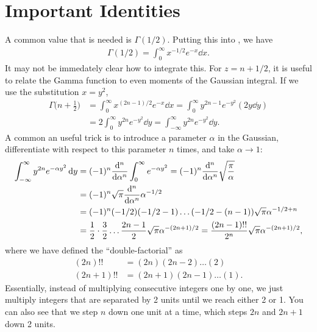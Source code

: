 \section{Important Identities}

A common value that is needed is $\Gamma(1/2)$.
Putting this into , we have
\begin{eqnarray}
    \Gamma(1/2) = \int_{0}^{\infty} x^{-1/2} e^{-x} \dd{x}
.\end{eqnarray}
It may not be immedately clear how to integrate this.
For $z = n + 1/2$, it is useful to relate the Gamma function to even moments of the Gaussian integral.
If we use the substitution $x = y^2$,
\begin{align}
    \Gamma\Big(n + \frac{1}{2} \Big) &= \int_{0}^{\infty} x^{(2n-1)/2} e^{-x} \dd{x} = \int_{0}^{\infty} y^{2n - 1} e^{-y^2} ( 2 y \dd{y} ) \nonumber \\
    \label{eq:gamma-odd-half-int}
                                     &= 2 \int_{0}^{\infty} y^{2n} e^{-y^2} \dd{y} = \int_{-\infty}^{\infty} y^{2n} e^{-y^2} \dd{y}
.\end{align}
A common an useful trick is to introduce a parameter $\alpha$ in the Gaussian, differentiate with respect to this parameter $n$ times, and take $\alpha \rightarrow 1$:
\begin{align}
    \int_{-\infty}^{\infty} y^{2n} e^{-\alpha y^2} \dd{y} &= (-1)^{n} \dv[n]{\alpha} \int_{0}^{\infty} e^{-\alpha y^2} = (-1)^{n} \dv[n]{\alpha} \sqrt{\frac{\pi}{\alpha}} \nonumber \\
                                                          &= (-1)^{n} \sqrt{\pi} \dv[n]{\alpha} \alpha^{-1/2} \nonumber \\
                                                          &= (-1)^{n}(-1/2)(-1/2 - 1)\hdots(-1/2 - (n-1)) \sqrt{\pi} \alpha^{-1/2 + n} \nonumber \\
                                                          &= \frac{1}{2} \cdot \frac{3}{2} \ldots  \frac{2n-1}{2} \sqrt{\pi} \alpha^{-(2n+1)/2} = \frac{(2n-1)!!}{2^{n}} \sqrt{\pi} \alpha^{-(2n+1)/2}
,\end{align}
where we have defined the ``double-factorial'' as
\begin{align}
    (2n)!! &= (2n)(2n-2)\ldots(2) \\
    (2n+1)!! &= (2n+1)(2n-1)\ldots(1)
.\end{align}
Essentially, instead of multiplying consecutive integers one by one, we just multiply integers that are separated by 2 units until we reach either 2 or 1.
You can also see that we step $n$ down one unit at a time, which steps $2n$ and $2n+1$ down 2 units.

